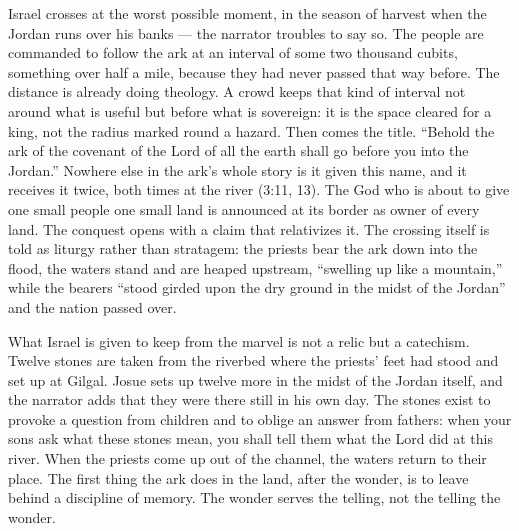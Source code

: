 Israel crosses at the worst possible moment, in the season of harvest when
the Jordan runs over his banks --- the narrator troubles to say so. The
people are commanded to follow the ark at an interval of some two thousand
cubits, something over half a mile, because they had never passed that way
before. The
distance is already doing theology. A crowd keeps that kind of interval not
around what is useful but before what is sovereign: it is the space cleared
for a king, not the radius marked round a hazard. Then comes the title.
``Behold the ark of the covenant of the Lord of all the earth shall go
before you into the Jordan.''
Nowhere else in the ark's whole story is it given this name, and it receives
it twice, both times at the river (3:11, 13). The God who is about to give
one small people one small land is announced at its border as owner of every
land. The conquest opens with a claim that relativizes it. The crossing
itself is told as liturgy rather than stratagem: the priests bear the ark
down into the flood, the waters stand and are heaped upstream, ``swelling up
like a mountain,'' while the bearers ``stood girded upon the dry ground in
the midst of the Jordan'' and the nation passed over.

What Israel is given to keep from the marvel is not a relic but a catechism.
Twelve stones are taken from the riverbed where the priests' feet had stood
and set up at Gilgal. Josue sets up twelve more in the midst of the Jordan
itself, and the narrator adds that they were there still in his own day. The
stones exist to provoke a question from children and to oblige an answer
from fathers: when your sons ask what these stones mean, you shall tell them
what the Lord did at this river. When the priests come up out of the
channel, the waters return to their place. The first thing the
ark does in the land, after the wonder, is to leave behind a discipline of
memory. The wonder serves the telling, not the telling the wonder.

